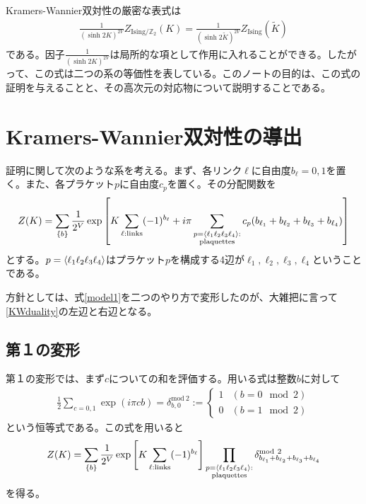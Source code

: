\documentclass[a4paper,12pt,dvipdfmx]{jlreq}
\newcommand{\Kt}{\widetilde{K}}
\newcommand{\ZIs}{Z_{\mathrm{Ising}}}
\newcommand{\ZGIs}{Z_{\mathrm{Ising}/\mathbb{Z}_2}}
\newcommand{\deltamod}{\delta^{\mathrm{mod}\ 2}}
\begin{document}
Kramers-Wannier双対性の厳密な表式は
\begin{align}
  \frac{1}{(\sinh 2K)^{2V}}\ZGIs(K)=
  \frac{1}{(\sinh 2\Kt)^{2V}}\ZIs(\Kt)
  \label{KWduality}
\end{align}
である。因子$\frac{1}{(\sinh 2K)^{2V}}$は局所的な項として作用に入れることができる。したがって、この式は二つの系の等価性を表している。このノートの目的は、この式の証明を与えることと、その高次元の対応物について説明することである。

\section{Kramers-Wannier双対性の導出}
証明に関して次のような系を考える。まず、各リンク$\ell$に自由度$b_{\ell}=0,1$を置く。また、各プラケット$p$に自由度$c_{p}$を置く。その分配関数を
\begin{align}
  Z(K)=\sum_{\{b\}}\frac{1}{2^{V}} \exp\left[
    K\sum_{\ell:\text{links}}(-1)^{b_{\ell}}+i\pi\sum_{\substack{p=\expval{\ell_1 \ell_2 \ell_3 \ell_4}:\\ \text{plaquettes}}} c_{p}(b_{\ell_1}+b_{\ell_2}+b_{\ell_3}+b_{\ell_4})
  \right]
  \label{model1}
\end{align}
とする。$p=\expval{\ell_1 \ell_2 \ell_3 \ell_4}$はプラケット$p$を構成する4辺が$\ell_1, \ell_2, \ell_3, \ell_4$ということである。

方針としては、式\eqref{model1}を二つのやり方で変形したのが、大雑把に言って\eqref{KWduality}の左辺と右辺となる。

\subsection{第１の変形}
第１の変形では、まず$c$についての和を評価する。用いる式は整数$b$に対して 
\begin{align}
  \frac12\sum_{c=0,1}\exp(i\pi c b )
  =\deltamod_{b,0}
  :=
  \begin{cases}
    1& (b=0 \mod 2)\\
    0& (b=1 \mod 2)
  \end{cases}
\end{align}
という恒等式である。この式を用いると
\begin{align}
  Z(K)=\sum_{\{b\}}\frac{1}{2^{V}} \exp\left[
    K\sum_{\ell:\text{links}}(-1)^{b_{\ell}}
    \right]
    \prod_{\substack{p=\expval{\ell_1 \ell_2 \ell_3 \ell_4}:\\ \text{plaquettes}}} \deltamod_{b_{\ell_1}+b_{\ell_2}+b_{\ell_3}+b_{\ell_4}}
    \label{model1-1-1}
\end{align}
を得る。
\end{document}

